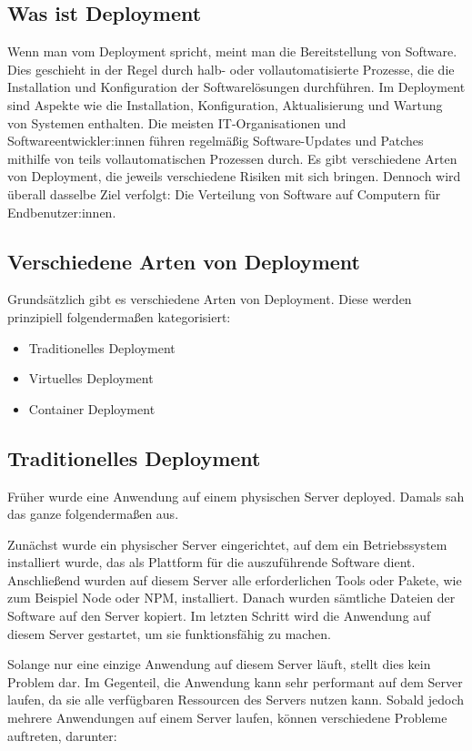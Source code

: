 \subsection{Was ist Deployment}

Wenn man vom Deployment spricht, meint man die Bereitstellung von Software. Dies geschieht in der Regel durch halb- oder vollautomatisierte Prozesse, die die Installation und Konfiguration der Softwarelösungen durchführen. Im Deployment sind Aspekte wie die Installation, Konfiguration, Aktualisierung und Wartung von Systemen enthalten.
Die meisten IT-Organisationen und Softwareentwickler:innen führen regelmäßig Software-Updates und Patches mithilfe von teils vollautomatischen Prozessen durch. Es gibt verschiedene Arten von Deployment, die jeweils verschiedene Risiken mit sich bringen. Dennoch wird überall dasselbe Ziel verfolgt: Die Verteilung von Software auf Computern für Endbenutzer:innen.

\subsection{Verschiedene Arten von Deployment}

Grundsätzlich gibt es verschiedene Arten von Deployment. Diese werden prinzipiell folgendermaßen kategorisiert:
    \begin{itemize}
    \item Traditionelles Deployment
    \item Virtuelles Deployment
    \item Container Deployment
    \end{itemize}
\newpage
\subsection{Traditionelles Deployment}

Früher wurde eine Anwendung auf einem physischen Server deployed. Damals sah das ganze folgendermaßen aus.

Zunächst wurde ein physischer Server eingerichtet, auf dem ein Betriebssystem installiert wurde, das als Plattform für die auszuführende Software dient. Anschließend wurden auf diesem Server alle erforderlichen Tools oder Pakete, wie zum Beispiel Node oder NPM, installiert. Danach wurden sämtliche Dateien der Software auf den Server kopiert. Im letzten Schritt wird die Anwendung auf diesem Server gestartet, um sie funktionsfähig zu machen.


Solange nur eine einzige Anwendung auf diesem Server läuft, stellt dies kein Problem dar. Im Gegenteil, die Anwendung kann sehr performant auf dem Server laufen, da sie alle verfügbaren Ressourcen des Servers nutzen kann. Sobald jedoch mehrere Anwendungen auf einem Server laufen, können verschiedene Probleme auftreten, darunter:

